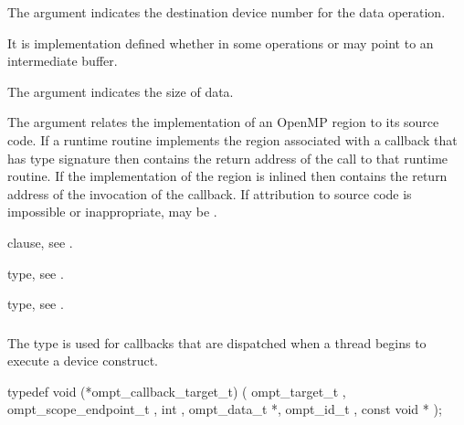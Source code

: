 The  argument indicates the destination device
number for the data operation.

It is implementation defined whether in some operations 
or  may point to an intermediate buffer.

The  argument indicates the size of data.

The  argument relates the implementation of an OpenMP region
to its source code. If a runtime routine implements the region associated with
a callback that has type signature  then
 contains the return address of the call to that runtime routine.
If the implementation of the region is inlined then  contains the
return address of the invocation of the callback. If attribution to source code
is impossible or inappropriate,  may be .

\begin{crossrefs}
\item {} clause, see .

\item {} type, see .

\item {} type, see
.
\end{crossrefs}



\subsubsection{}
\label{sec:ompt_callback_target_t}

\summary
The  type is used for callbacks that are
dispatched when a thread begins to execute a device construct.

\format
\begin{ccppspecific}
\begin{omptCallback}
typedef void (*ompt_callback_target_t) (
  ompt_target_t ,
  ompt_scope_endpoint_t ,
  int ,
  ompt_data_t *,
  ompt_id_t ,
  const void *
);
\end{omptCallback}
\end{ccppspecific}

